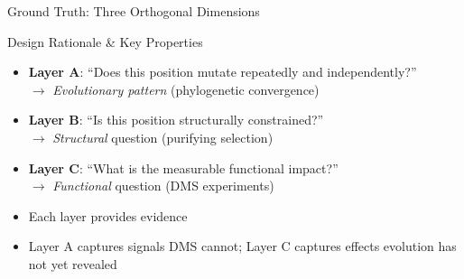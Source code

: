 \begin{frame}{Ground Truth: Three Orthogonal Dimensions}
  \begin{block}{Design Rationale \& Key Properties}
    \begin{itemize}
      \item \textbf{Layer A}: ``Does this position mutate repeatedly and independently?'' \\
            $\rightarrow$ \textit{Evolutionary pattern} (phylogenetic convergence)
      \item \textbf{Layer B}: ``Is this position structurally constrained?'' \\
            $\rightarrow$ \textit{Structural} question (purifying selection)
      \item \textbf{Layer C}: ``What is the measurable functional impact?'' \\
            $\rightarrow$ \textit{Functional} question (DMS experiments)
      \item Each layer provides  evidence
      \item Layer A captures signals DMS cannot; Layer C captures effects evolution has not yet revealed
    \end{itemize}
  \end{block}
\end{frame}

